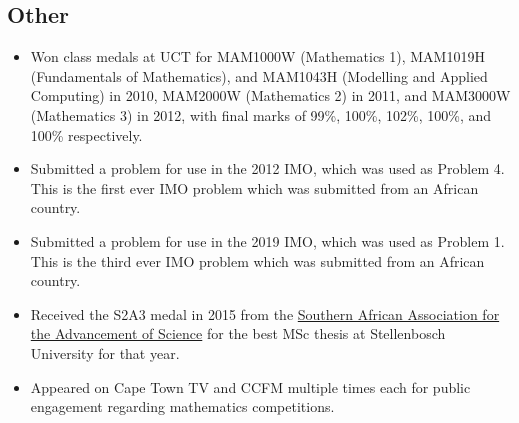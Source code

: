 \documentclass{article}
\begin{document}
\subsection{Other}
\begin{itemize}
	\item Won class medals at UCT for MAM1000W (Mathematics 1), MAM1019H (Fundamentals of Mathematics), and MAM1043H (Modelling and Applied Computing) in 2010, MAM2000W (Mathematics 2) in 2011, and MAM3000W (Mathematics 3) in 2012, with final marks of 99\%, 100\%, 102\%, 100\%, and 100\% respectively.
	\item Submitted a problem for use in the 2012 IMO, which was used as Problem 4. This is the first ever IMO problem which was submitted from an African country.
	\item Submitted a problem for use in the 2019 IMO, which was used as Problem 1. This is the third ever IMO problem which was submitted from an African country.
	\item Received the S2A3 medal in 2015 from the \href{http://s2a3.org.za/joomla/index.php}{Southern African Association for the Advancement of Science} for the best MSc thesis at Stellenbosch University for that year.
	\item Appeared on Cape Town TV and CCFM multiple times each for public engagement regarding mathematics competitions.
\end{itemize}


\end{document}
